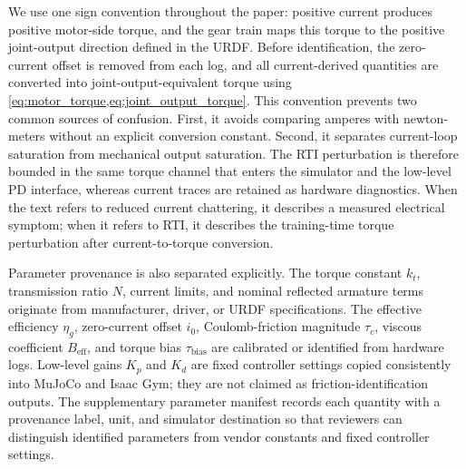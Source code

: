 \documentclass[twoside,final,1p,times]{elsarticle}
\newenvironment{revblock}{}{}
\begin{document}
\begin{revblock}
We use one sign convention throughout the paper: positive current produces positive motor-side torque, and the gear train maps this torque to the positive joint-output direction defined in the URDF. Before identification, the zero-current offset is removed from each log, and all current-derived quantities are converted into joint-output-equivalent torque using \cref{eq:motor_torque,eq:joint_output_torque}. This convention prevents two common sources of confusion. First, it avoids comparing amperes with newton-meters without an explicit conversion constant. Second, it separates current-loop saturation from mechanical output saturation. The RTI perturbation is therefore bounded in the same torque channel that enters the simulator and the low-level PD interface, whereas current traces are retained as hardware diagnostics. When the text refers to reduced current chattering, it describes a measured electrical symptom; when it refers to RTI, it describes the training-time torque perturbation after current-to-torque conversion.

Parameter provenance is also separated explicitly. The torque constant $k_t$, transmission ratio $N$, current limits, and nominal reflected armature terms originate from manufacturer, driver, or URDF specifications. The effective efficiency $\eta_g$, zero-current offset $i_0$, Coulomb-friction magnitude $\tau_c$, viscous coefficient $B_{\mathrm{eff}}$, and torque bias $\tau_{\mathrm{bias}}$ are calibrated or identified from hardware logs. Low-level gains $K_p$ and $K_d$ are fixed controller settings copied consistently into MuJoCo and Isaac Gym; they are not claimed as friction-identification outputs. The supplementary parameter manifest records each quantity with a provenance label, unit, and simulator destination so that reviewers can distinguish identified parameters from vendor constants and fixed controller settings.
\end{revblock}
\end{document}
